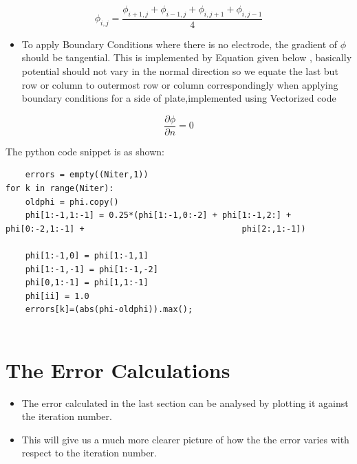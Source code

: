 \documentclass[11pt, a4paper]{article}
\begin{document}
   \begin{equation}
           \phi_{i,j} = \frac{\phi_{i+1,j} + \phi_{i-1,j} + \phi_{i,j+1} + \phi_{i,j-1}}{4} 
   \end{equation}
   
   \begin{itemize}
   \item
     To apply Boundary Conditions where there is no electrode, the gradient
     of \(\phi\) should be tangential. This is implemented by Equation
     given below , basically potential should not vary in the normal
     direction so we equate the last but row or column to outermost row or
     column correspondingly when applying boundary conditions for a side of
     plate,implemented using Vectorized code
   \end{itemize}
   
   \begin{equation}
    \frac{\partial \phi}{\partial n} = 0
   \end{equation}
   
   The python code snippet is as shown:

   \begin{verbatim}
    errors = empty((Niter,1))
for k in range(Niter):
    oldphi = phi.copy()
    phi[1:-1,1:-1] = 0.25*(phi[1:-1,0:-2] + phi[1:-1,2:] + phi[0:-2,1:-1] +		                           phi[2:,1:-1])

    phi[1:-1,0] = phi[1:-1,1]
    phi[1:-1,-1] = phi[1:-1,-2]
    phi[0,1:-1] = phi[1,1:-1]
    phi[ii] = 1.0
    errors[k]=(abs(phi-oldphi)).max();
    
         \end{verbatim}
 
 \section{The Error Calculations}  
 \begin{itemize}
 \item
 The error calculated in the last section can be analysed by plotting it against the iteration number.
 \item
 This will give us a much more clearer picture of how the the error varies with respect to the iteration number.
 \end{itemize}
\newpage 
 
\end{document}
